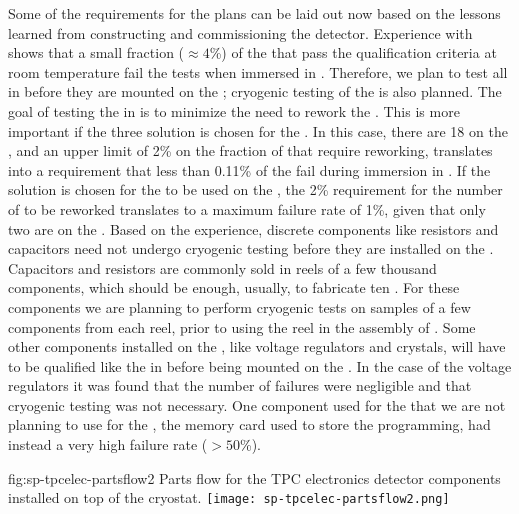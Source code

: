 Some of the requirements for the  plans can
be laid out now based on the lessons learned
from constructing and commissioning the 
detector. Experience with  shows that a small fraction
($\approx4$\%) of the   that pass the
qualification criteria at room temperature fail the tests
when immersed in \lntwo. Therefore, we plan to test all  in \lntwo
before they are mounted on the ; 
cryogenic testing of the  is also planned. The goal of testing 
the  in \lntwo is to minimize the need
to rework the . This is more important if 
the three  solution is chosen for the
. In this case, there are 18  on the
, and an upper limit of 2\% on the fraction of
 that require reworking, translates into a requirement 
that less than 0.11\% of the  fail during immersion in \lntwo.
If the  solution is chosen for the 
to be used on the , the 2\% requirement for the
number of  to be reworked translates to a 
maximum failure rate of 1\%, given that only two
 are on the . Based on the 
experience, discrete components like resistors and capacitors
need not undergo cryogenic testing before they are installed
on the . Capacitors and resistors are commonly
sold in reels of a few thousand components, which
should be enough, usually, to fabricate ten
. For these components we are planning to
perform cryogenic tests on samples of a few components
from each reel, prior to using the reel in the assembly of
. Some other components installed on
the , like voltage regulators and crystals, 
will have to be qualified like the 
in \lntwo before being mounted on the . In the
case of the voltage regulators it was found that the number
of failures were negligible and that cryogenic testing was
not necessary. One component used for the 
that we are not planning to use for the  ,
the memory card used to store the  programming,
had instead a very high failure rate ($>50$\%).

\begin{dunefigure}
{fig:sp-tpcelec-partsflow2}
{Parts flow for the TPC electronics detector components installed on top of the cryostat.}
\texttt{[image: sp-tpcelec-partsflow2.png]}
\end{dunefigure}

